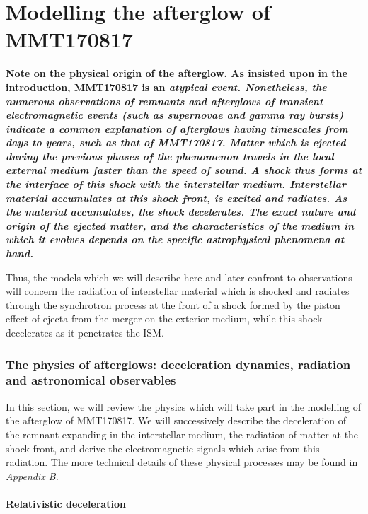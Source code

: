 \part{Modelling the afterglow of MMT170817}

\bf{Note on the physical origin of the afterglow.} As insisted upon in the introduction, MMT170817 is an \it{atypical} event. Nonetheless, the numerous observations of remnants and afterglows of transient electromagnetic events (such as supernovae and gamma ray bursts) indicate a common explanation of afterglows having timescales from days to years, such as that of MMT170817. Matter which is ejected during the previous phases of the phenomenon travels in the local external medium faster than the speed of sound. A shock thus forms at the interface of this shock with the interstellar medium. Interstellar material accumulates at this shock front, is excited and radiates. As the material accumulates, the shock decelerates. The exact nature and origin of the ejected matter, and the characteristics of the medium in which it evolves depends on the specific astrophysical phenomena at hand.

Thus, the models which we will describe here and later confront to observations will concern the radiation of interstellar material which is shocked and radiates through the synchrotron process at the front of a shock formed by the piston effect of ejecta from the merger on the exterior medium, while this shock decelerates as it penetrates the ISM.

\section{The physics of afterglows: deceleration dynamics, radiation and astronomical observables}

In this section, we will review the physics which will take part in the modelling of the afterglow of MMT170817. We will successively describe the deceleration of the remnant expanding in the interstellar medium, the radiation of matter at the shock front, and derive the electromagnetic signals which arise from this radiation. The more technical details of these physical processes may be found in \it{Appendix B}.

\subsection{Relativistic deceleration}

